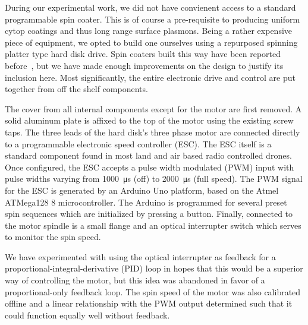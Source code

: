 During our experimental work, we did not have convienent access to a
standard programmable spin coater.  This is of course a pre-requisite to
producing uniform cytop coatings and thus long range surface plasmons.
Being a rather expensive piece of equipment, we opted to build one
ourselves using a repurposed spinning platter type hard disk drive.
Spin coaters built this way have been reported
before~\cite{bianchi2006spin}, but we have made enough improvements on the
design to justify its inclusion here.  Most significantly, the entire
electronic drive and control are put together from off the shelf
components.

The cover from all internal components except for the motor are first
removed.  A solid aluminum plate is affixed to the top of the motor using
the existing screw taps.  The three leads of the hard disk's three phase
motor are connected directly to a programmable electronic speed controller
(ESC).  The ESC itself is a standard component found in most land and air
based radio controlled drones.  Once configured, the ESC accepts a pulse
width modulated (PWM) input with pulse widths varying from
\SI{1000}{\micro\second} (off) to \SI{2000}{\micro\second} (full speed).
The PWM signal for the ESC is generated by an Arduino Uno platform, based
on the Atmel ATMega128 \SI{8}{\bit} microcontroller.  The Arduino is
programmed for several preset spin sequences which are initialized by
pressing a button.  Finally, connected to the motor spindle is a small
flange and an optical interrupter switch which serves to monitor the spin
speed.  

We have experimented with using the optical interrupter as feedback for a
proportional-integral-derivative (PID) loop in hopes that this would be a
superior way of controlling the motor, but this idea was abandoned in favor
of a proportional-only feedback loop.  The spin speed of the motor was also
calibrated offline and a linear relationship with the PWM output determined
such that it could function equally well without feedback.  


